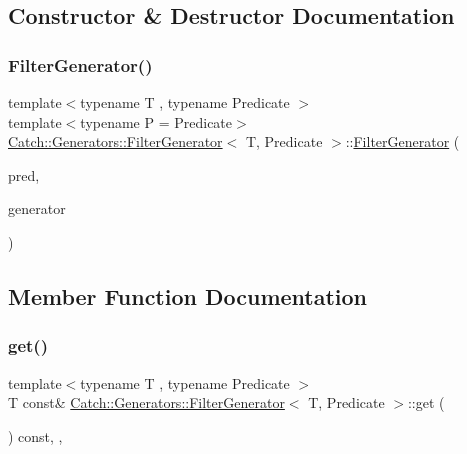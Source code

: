 \subsection{Constructor \& Destructor Documentation}
\mbox{\label{class_catch_1_1_generators_1_1_filter_generator_aa16886a5e41cbd3b6ffa3dd52388a3a1}} 
\subsubsection{\texorpdfstring{Filter\+Generator()}{FilterGenerator()}}
{\footnotesize\ttfamily template$<$typename T , typename Predicate $>$ \\
template$<$typename P  = Predicate$>$ \\
\mbox{\hyperlink{class_catch_1_1_generators_1_1_filter_generator}{Catch\+::\+Generators\+::\+Filter\+Generator}}$<$ T, Predicate $>$\+::\mbox{\hyperlink{class_catch_1_1_generators_1_1_filter_generator}{Filter\+Generator}} (\begin{DoxyParamCaption}\item[{P \&\&}]{pred,  }\item[{\mbox{\hyperlink{class_catch_1_1_generators_1_1_generator_wrapper}{Generator\+Wrapper}}$<$ T $>$ \&\&}]{generator }\end{DoxyParamCaption})\hspace{0.3cm}{\ttfamily [inline]}}



\subsection{Member Function Documentation}
\mbox{\label{class_catch_1_1_generators_1_1_filter_generator_ab30e81b61a77430661d40f814758f6fe}} 
\subsubsection{\texorpdfstring{get()}{get()}}
{\footnotesize\ttfamily template$<$typename T , typename Predicate $>$ \\
T const\& \mbox{\hyperlink{class_catch_1_1_generators_1_1_filter_generator}{Catch\+::\+Generators\+::\+Filter\+Generator}}$<$ T, Predicate $>$\+::get (\begin{DoxyParamCaption}{ }\end{DoxyParamCaption}) const\hspace{0.3cm}{\ttfamily [inline]}, {\ttfamily [override]}, {\ttfamily [virtual]}}



